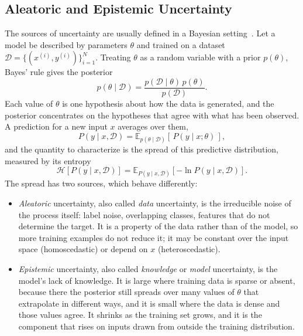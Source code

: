 \subsection{Aleatoric and Epistemic Uncertainty}
    \label{subsec:bg:uncertainty:taxonomy}
    The sources of uncertainty are usually defined in a Bayesian
    setting~\cite{malinin2021}. Let a
    model be described by parameters $\theta$ and trained on a dataset
    $\mathcal{D} = \{(x^{(i)}, y^{(i)})\}_{i=1}^{N}$. Treating $\theta$ as a random
    variable with a prior $p(\theta)$, Bayes' rule gives the posterior
    \begin{equation}
        p(\theta \mid \mathcal{D}) =
        \frac{p(\mathcal{D} \mid \theta)\, p(\theta)}{p(\mathcal{D})}.
        \label{eq:bg:unc:bayes}
    \end{equation}
    Each value of $\theta$ is one hypothesis about how the data is generated, and
    the posterior concentrates on the hypotheses that agree with what has been
    observed. A prediction for a new input $x$ averages over them,
    \begin{equation}
        P(y \mid x, \mathcal{D}) =
        \mathbb{E}_{p(\theta \mid \mathcal{D})}\!\left[\, P(y \mid x; \theta) \,\right],
        \label{eq:bg:unc:predpost}
    \end{equation}
    and the quantity to characterize is the spread of this predictive
    distribution, measured by its entropy
    \begin{equation}
        \mathcal{H}\!\left[ P(y \mid x, \mathcal{D}) \right] = \mathbb{E}_{P(y \mid x, \mathcal{D})}\!\left[ -\ln P(y \mid x, \mathcal{D}) \right].
    \end{equation}
    The spread has two sources, which behave differently:
    \begin{itemize}
        \item \emph{Aleatoric} uncertainty, also called \emph{data} uncertainty, is the irreducible noise of the process itself: label noise, overlapping classes, features that do not determine the target. It is a property of the data rather than of the model, so more training examples do not reduce it; it may be constant over the input space (homoscedastic) or depend on $x$ (heteroscedastic). 
        
        \item \emph{Epistemic} uncertainty, also called \emph{knowledge} or \emph{model} uncertainty, is the model's lack of knowledge. It is large where training data is sparse or absent, because there the posterior still spreads over many values of $\theta$ that extrapolate in different ways, and it is small where the data is dense and those values agree. It shrinks as the training set grows, and it is the component that rises on inputs drawn from outside the training distribution.
    \end{itemize}
